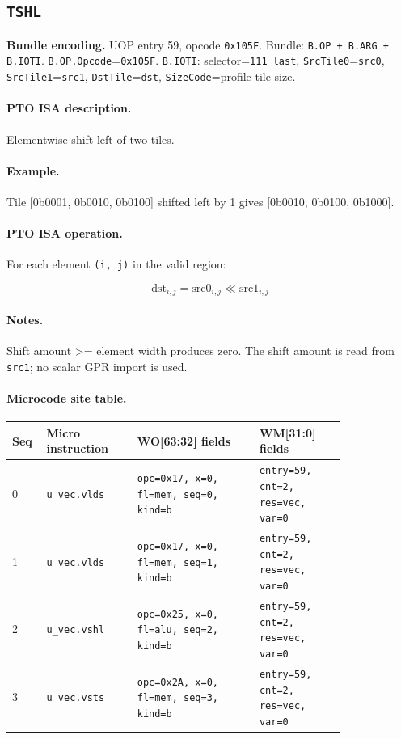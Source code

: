 \subsection{\texttt{TSHL}}
\noindent\textbf{Bundle encoding.} UOP entry 59, opcode \texttt{0x105F}. Bundle: \texttt{B.OP + B.ARG + B.IOTI}. \texttt{B.OP.Opcode}=\texttt{0x105F}. \texttt{B.IOTI}: selector=\texttt{111 last}, \texttt{SrcTile0}=\texttt{src0}, \texttt{SrcTile1}=\texttt{src1}, \texttt{DstTile}=\texttt{dst}, \texttt{SizeCode}=profile tile size.\par\smallskip
{\small
\paragraph{PTO ISA description.}
Elementwise shift-left of two tiles.
\paragraph{Example.}
Tile [0b0001, 0b0010, 0b0100] shifted left by 1 gives [0b0010, 0b0100, 0b1000].
\par\smallskip
\paragraph{PTO ISA operation.}
For each element \texttt{(i, j)} in the valid region:

\[
\mathrm{dst}_{i,j} = \mathrm{src0}_{i,j} \ll \mathrm{src1}_{i,j}
\]
}\par\smallskip
\paragraph{Notes.}
Shift amount >= element width produces zero. The shift amount is read from \texttt{src1}; no scalar GPR import is used.
\paragraph{Microcode site table.}
{\scriptsize
\begin{longtable}{@{}R{0.055\linewidth}L{0.23\linewidth}L{0.31\linewidth}L{0.22\linewidth}@{}}
\toprule
Seq & Micro instruction & WO[63:32] fields & WM[31:0] fields \\
 & \texttt{u\_vec.vlds} & \texttt{opc=0x17, x=0, fl=mem, seq=0, kind=b} & \texttt{entry=59, cnt=2, res=vec, var=0} \\
1 & \texttt{u\_vec.vlds} & \texttt{opc=0x17, x=0, fl=mem, seq=1, kind=b} & \texttt{entry=59, cnt=2, res=vec, var=0} \\
2 & \texttt{u\_vec.vshl} & \texttt{opc=0x25, x=0, fl=alu, seq=2, kind=b} & \texttt{entry=59, cnt=2, res=vec, var=0} \\
3 & \texttt{u\_vec.vsts} & \texttt{opc=0x2A, x=0, fl=mem, seq=3, kind=b} & \texttt{entry=59, cnt=2, res=vec, var=0} \\
\bottomrule
\end{longtable}
}
